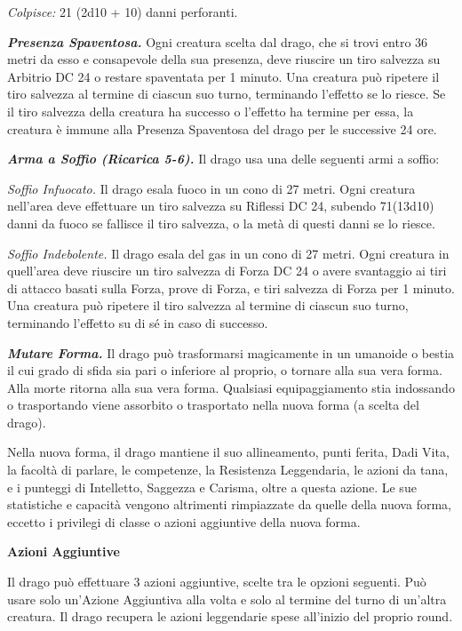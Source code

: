 \begin{multicols}{2}
\emph{Colpisce:} 21 (2d10 + 10) danni perforanti.

\emph{\textbf{Presenza Spaventosa.}} Ogni creatura scelta dal drago, che
si trovi entro 36 metri da esso e consapevole della sua presenza, deve
riuscire un tiro salvezza su Arbitrio DC 24 o restare spaventata per 1
minuto. Una creatura può ripetere il tiro salvezza al termine di ciascun
suo turno, terminando l'effetto se lo riesce. Se il tiro salvezza della
creatura ha successo o l'effetto ha termine per essa, la creatura è
immune alla Presenza Spaventosa del drago per le successive 24 ore.

\emph{\textbf{Arma a Soffio (Ricarica 5-6).}} Il drago usa una delle
seguenti armi a soffio:

\emph{Soffio Infuocato.} Il drago esala fuoco in un cono di 27 metri.
Ogni creatura nell'area deve effettuare un tiro salvezza su Riflessi DC
24, subendo 71(13d10) danni da fuoco se fallisce il tiro salvezza, o la
metà di questi danni se lo riesce.

\emph{Soffio Indebolente.} Il drago esala del gas in un cono di 27
metri. Ogni creatura in quell'area deve riuscire un tiro salvezza di Forza DC 24 o avere svantaggio ai tiri di attacco basati sulla Forza,
prove di Forza, e tiri salvezza di Forza per 1 minuto. Una creatura può
ripetere il tiro salvezza al termine di ciascun suo turno, terminando
l'effetto su di sé in caso di successo.

\emph{\textbf{Mutare Forma.}} Il drago può trasformarsi magicamente in
un umanoide o bestia il cui grado di sfida sia pari o inferiore al
proprio, o tornare alla sua vera forma. Alla morte ritorna alla sua vera
forma. Qualsiasi equipaggiamento stia indossando o trasportando viene
assorbito o trasportato nella nuova forma (a scelta del drago).

Nella nuova forma, il drago mantiene il suo allineamento, punti ferita,
Dadi Vita, la facoltà di parlare, le competenze, la Resistenza
Leggendaria, le azioni da tana, e i punteggi di Intelletto, Saggezza e
Carisma, oltre a questa azione. Le sue statistiche e capacità vengono
altrimenti rimpiazzate da quelle della nuova forma, eccetto i privilegi
di classe o azioni aggiuntive della nuova forma.

\textbf{Azioni Aggiuntive}

Il drago può effettuare 3 azioni aggiuntive, scelte tra le opzioni
seguenti. Può usare solo un'Azione Aggiuntiva alla volta e solo al
termine del turno di un'altra creatura. Il drago recupera le azioni
leggendarie spese all'inizio del proprio round.


\end{multicols}
